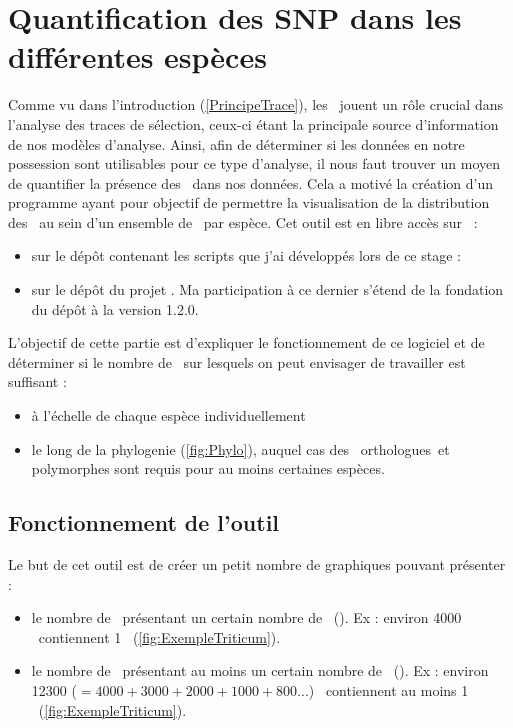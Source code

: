 \documentclass[../main]{subfiles} %
\begin{document}
\addto\extrasfrench{\protected\edef:{\unexpanded\expandafter{:}}}


\section{Quantification des SNP dans les différentes espèces}
\label{sec:SnpHeatmap}
Comme vu dans l'introduction (\cref{PrincipeTrace}), les \SNP jouent un rôle crucial dans l'analyse des traces de sélection, ceux-ci étant la principale source d'information de nos modèles d'analyse. Ainsi, afin de déterminer si les données en notre possession sont utilisables pour ce type d’analyse, il nous faut trouver un moyen de quantifier la présence des \SNP dans nos données. Cela a motivé la création d’un programme ayant pour objectif de permettre la visualisation de la distribution des \SNP au sein d’un ensemble de \contigs par espèce. Cet outil est en libre accès sur \GitHub :
\begin{itemize}
    \item sur le dépôt contenant les scripts que j'ai développés lors de ce stage : \cite{internship2024}
    \item sur le dépôt du projet \cite{snpheatmap}. Ma participation à ce dernier s'étend de la fondation du dépôt à la version 1.2.0.
\end{itemize}

L'objectif de cette partie est d'expliquer le fonctionnement de ce logiciel et de déterminer si le nombre de \contigs sur lesquels on peut envisager de travailler est suffisant :
\begin{itemize}
    \item à l’échelle de chaque espèce individuellement
    \item le long de la \gls{phylogenie} (\cref{fig:Phylo}), auquel cas des \contigs \glspl{orthologue} et polymorphes sont requis pour au moins certaines espèces.  
\end{itemize}

\subsection{Fonctionnement de l’outil} 
\label{sec:FonctionnementSNPHeatmap}
Le but de cet outil est de créer un petit nombre de graphiques pouvant présenter :

\begin{itemize}
    \item le nombre de \contigs présentant un certain nombre de \SNP (\GNSPeq). Ex : environ 
    \num{4000}
    \contigs contiennent 1 \SNP (\cref{fig:ExempleTriticum}).
    
    \item le  nombre de \contigs présentant au moins un certain nombre de \SNP (\GNSPge). Ex : environ \num{12 300} ($= \num{4 000} + \num{3 000} + \num{2 000} + \num{1 000} + \num{800} ...$) \contigs contiennent au moins 1 \SNP (\cref{fig:ExempleTriticum}). 
\end{itemize}
\end{document}

